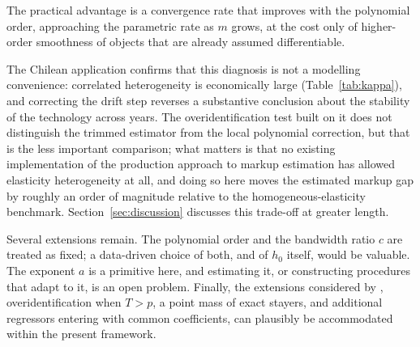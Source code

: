 \documentclass{article}
\begin{document}
The practical advantage is a convergence rate that improves with the polynomial order, approaching
the parametric rate as $m$ grows, at the cost only of higher-order smoothness of objects that are
already assumed differentiable.

The Chilean application confirms that this diagnosis is not a modelling convenience: correlated
heterogeneity is economically large (Table~\ref{tab:kappa}), and correcting the drift step reverses a
substantive conclusion about the stability of the technology across years. The overidentification
test built on it does not distinguish the trimmed estimator from the local polynomial correction, but
that is the less important comparison; what matters is that no existing implementation of the
production approach to markup estimation has allowed elasticity heterogeneity at all, and doing so
here moves the estimated markup gap by roughly an order of magnitude relative to the
homogeneous-elasticity benchmark. Section~\ref{sec:discussion} discusses this trade-off at greater
length.

Several extensions remain. The polynomial order and the bandwidth ratio $c$ are treated as fixed;
a data-driven choice of both, and of $h_0$ itself, would be valuable. The exponent $a$ is a primitive here, and
estimating it, or constructing procedures that adapt to it, is an open problem. Finally, the
extensions considered by \cite{grahampowell}, overidentification when $T>p$, a point mass of
exact stayers, and additional regressors entering with common coefficients, can plausibly be
accommodated within the present framework.
\end{document}
